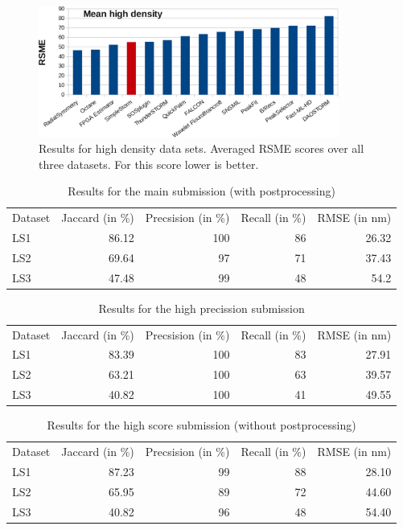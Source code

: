 \begin{figure}
\centering
\includegraphics[width = 0.88\textwidth]{pictures/diagrammsChallenge/MeanHighDensityRSMECropped.pdf}
	\caption{Results for high density data sets. Averaged RSME scores over all three datasets. For this score lower is better.}
	\label{meanRSMEHighDensity}
\end{figure}







\begin{table}
\caption{Results for the main submission (with postprocessing)}
\begin{tabular}{lrrrr}
Dataset&Jaccard (in \%)&Precsision (in \%)& Recall (in \%) & RMSE (in nm)\\
LS1&86.12&100&86&26.32\\
LS2&69.64&97&71&37.43\\
LS3&47.48&99&48&54.2
\end{tabular}\label{resls1}
\end{table}


\begin{table}
\caption{Results for the high precission submission}
\begin{tabular}{lrrrr}
Dataset&Jaccard (in \%)&Precsision (in \%)& Recall (in \%) & RMSE (in nm)\\
LS1&83.39&100&83&27.91\\
LS2&63.21&100&63&39.57\\
LS3&40.82&100&41&49.55
\end{tabular}\label{resls2}
\end{table}
\begin{table}
\caption{Results for the high score submission (without postprocessing)}
\begin{tabular}{lrrrr}
Dataset&Jaccard (in \%)&Precsision (in \%)& Recall (in \%) & RMSE (in nm)\\
LS1&87.23&99&88&28.10\\
LS2&65.95&89&72&44.60\\
LS3&40.82&96&48&54.40
\end{tabular}\label{resls3}
\end{table}



